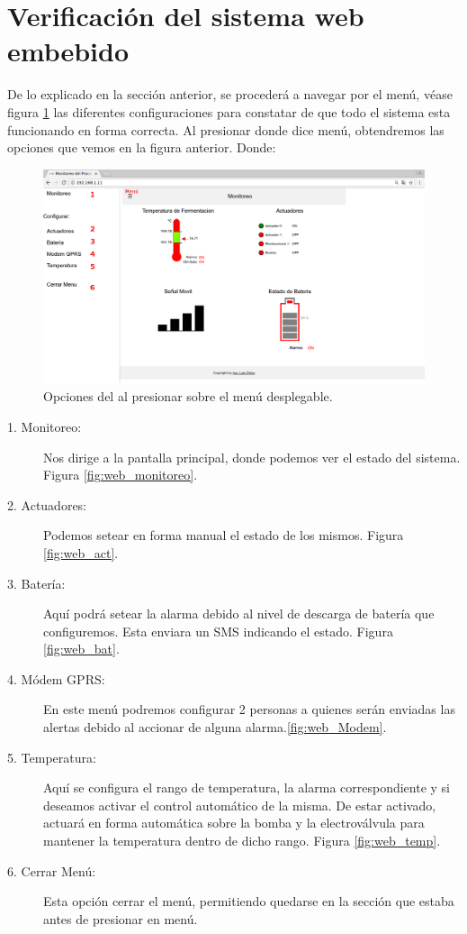\section{Verificación del sistema web embebido} 
De lo explicado en la sección anterior, se procederá a navegar por el menú, véase figura \ref{fig:web_menus_num} las diferentes configuraciones para constatar de que todo el sistema esta funcionando en forma correcta. Al presionar donde dice menú, obtendremos las opciones que vemos en la figura anterior. Donde:

\begin{figure}[h]
  \centering
  \includegraphics[scale=.25]{./Figures/web_menus_num.png}
  \caption{Opciones del al presionar sobre el menú desplegable.}
  \label{fig:web_menus_num}
\end{figure}



\begin{description}
  \item[1. Monitoreo:] Nos dirige a la pantalla principal, donde podemos ver el estado del sistema. Figura \ref{fig:web_monitoreo}.
  \item[2. Actuadores:] Podemos setear en forma manual el estado de los mismos. Figura \ref{fig:web_act}.
  \item[3. Batería:] Aquí podrá setear la alarma debido al nivel de descarga de batería que configuremos. Esta enviara un SMS indicando el estado. Figura \ref{fig:web_bat}.
  \item[4. Módem GPRS:] En este menú podremos configurar 2 personas a quienes serán enviadas las alertas debido al accionar de alguna alarma.\ref{fig:web_Modem}.
  \item[5. Temperatura:] Aquí se configura el rango de temperatura, la alarma correspondiente y si deseamos activar el control automático de la misma. De estar activado, actuará en forma automática sobre la bomba y la electroválvula para mantener la temperatura dentro de dicho rango. Figura \ref{fig:web_temp}.
  \item[6. Cerrar Menú:] Esta opción cerrar el menú, permitiendo quedarse en la sección que estaba antes de presionar en menú.
\end{description}

